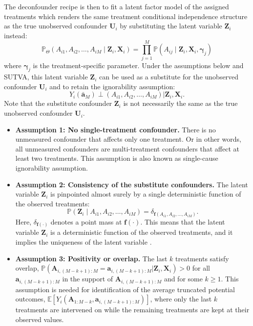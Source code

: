 The deconfounder recipe is then to fit a latent factor model of the assigned 
treatments which renders the same treatment conditional independence structure as the true unobserved confounder $\mathbf{U}_i$ 
by substituting the latent variable $\mathbf{Z}_i$ instead: 
$$\mathbb{P}_{\Theta}(A_{i1}, A_{i2}, \ldots, A_{iM}\mid \mathbf{Z}_i, \mathbf{X}_i) = \prod_{j=1}^{M} \mathbb{P}(A_{ij}\mid \mathbf{Z}_i, \mathbf{X}_i,\boldsymbol{\gamma}_j)$$
where $\boldsymbol{\gamma}_j$ is the treatment-specific parameter. Under the assumptions below and SUTVA,  
this latent variable $\mathbf{Z}_i$ can be used as a substitute for the unobserved confounder $\mathbf{U}_i$ 
and to retain the ignorability assumption:
$$Y_i(\bar{\mathbf{a}}_M) \perp (A_{i1}, A_{i2}, \ldots, A_{iM}) | \mathbf{Z}_i, \mathbf{X}_i.$$
Note that the substitute confounder $\mathbf{Z}_i$ is not necessarily the same as the true 
unobserved confounder $\mathbf{U}_i$.
\begin{itemize}
    \item \textbf{Assumption 1: No single-treatment confounder.} There is no 
    unmeasured confounder that affects only one treatment. Or in other words, 
    all unmeasured confounders are multi-treatment confounders that affect at least two treatments.
    This assumption is also known as single-cause ignorability assumption. 
    \item \textbf{Assumption 2: Consistency of the substitute confounders.} The latent variable $\mathbf{Z}_i$ is 
    pinpointed almost surely by a single deterministic function of the observed treatments:
    $$ \mathbb{P}(\mathbf{Z}_i \mid A_{i1}, A_{i2}, \ldots, A_{iM}) = \delta_{\mathbf{f}   (A_{i1}, A_{i2}, \ldots, A_{iM})}. $$
    Here, $\delta_{\mathbf{f}(\cdot)}$ denotes a point mass at $\mathbf{f}(\cdot)$. This means that the latent variable 
    $\mathbf{Z}_i$ is a deterministic function of the observed treatments, and it implies the 
    uniqueness of the latent variable \cite{wangClarifyingTheoryDeconfounder2020}. 
    \item \textbf{Assumption 3: Positivity or overlap.} The last $k$ treatments satisfy 
    overlap, $\mathbb{P}(\mathbf{A}_{i,(M-k+1):M} = \mathbf{a}_{i,(M-k+1):M} | \mathbf{Z}_i, \mathbf{X}_i) > 0$ for all $\mathbf{a}_{i,(M-k+1):M}$ in the support of $\mathbf{A}_{i,(M-k+1):M}$ and for some $k \ge 1$.
    This assumption is needed for identification of the average truncated potential outcomes,
    $\mathbb{E}[Y_i\left(\mathbf{A}_{1:M-k}, \mathbf{a}_{i,(M-k+1):M}\right)]$, where only the last $k$ treatments 
    are intervened on while the remaining treatments are kept at their observed values.  
   
\end{itemize}

